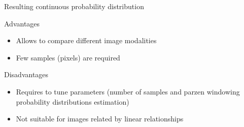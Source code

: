 
Resulting continuous probability distribution 



Advantages

\begin{itemize}
\item Allows to compare different image modalities
\item Few samples (pixels) are required
\end{itemize}

Disadvantages

\begin{itemize}
\item Requires to tune parameters (number of samples and parzen windowing probability distributions estimation)
\item Not suitable for images related by linear relationships
\end{itemize}





